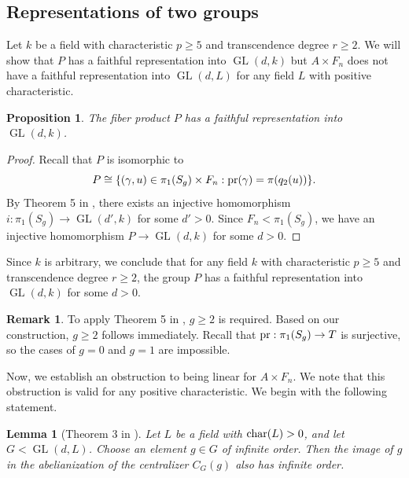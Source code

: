 \documentclass[11pt]{amsart}
\newtheorem{lem}[thm]{Lemma}
\newtheorem{prop}[thm]{Proposition}
\theoremstyle{definition}
\newtheorem{rmk}[thm]{Remark}
\DeclareMathOperator{\GL}{GL}
\begin{document}
\subsection{Representations of two groups}

Let $k$ be a field with characteristic $p \geq 5$ and transcendence degree $r \geq 2$.
We will show that $P$ has a faithful representation into $\GL(d,k)$ but $A \times F_n$ does not have a faithful representation into $\GL(d,L)$ for any field $L$ with positive characteristic.

\begin{prop}
 The fiber product $P$ has a faithful representation into $\GL(d,k)$.
\end{prop}
\begin{proof}
Recall that $P$ is isomorphic to
$$ P \cong \{ (\gamma,u) \in \pi_1(S_g) \times F_n : \textnormal{pr}(\gamma)=\pi(q_2(u)) \}.$$
By Theorem 5 in \cite{fisher2018character}, there exists an injective homomorphism $i:\pi_1(S_g) \to \GL(d',k)$ for some $d'>0$.
Since $F_n < \pi_1(S_g)$, we have an injective homomorphism $P \to \GL(d,k)$ for some $d>0$.
\end{proof}

 Since $k$ is arbitrary, we conclude that for any field $k$ with characteristic $p \geq 5$ and transcendence degree $r \geq 2$, the group $P$ has a faithful representation into $\GL(d,k)$ for some $d>0$.

\begin{rmk}
 To apply Theorem 5 in \cite{fisher2018character}, $g \geq 2$ is required.
 Based on our construction, $g \geq 2$ follows immediately.
 Recall that $\textnormal{pr} : \pi_1(S_g) \to T$ is surjective, so the cases of $g=0$ and $g=1$ are impossible.
\end{rmk}

 Now, we establish an obstruction to being linear for $A \times F_n$.
 We note that this obstruction is valid for any positive characteristic.
 We begin with the following statement.

\begin{lem}[Theorem 3 in \cite{button2016mapping}] \label{Lem:field_p-1}
 Let $L$ be a field with $\textnormal{char}(L)>0$, and let $G < \GL(d,L)$.
 Choose an element $ g \in G$ of infinite order.
 Then the image of $g$ in the abelianization of the centralizer $C_G(g)$ also has infinite order.
\end{lem}
\end{document}
